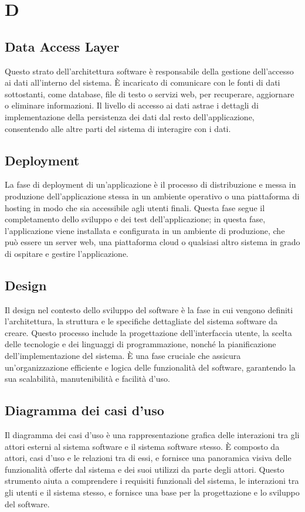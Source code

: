 \section*{D} 
\subsection*{Data Access Layer} 
Questo strato dell'architettura software è responsabile della gestione dell'accesso ai dati all'interno del sistema. È incaricato di comunicare con le fonti di dati sottostanti, come database, file di testo o servizi web, per recuperare, aggiornare o eliminare informazioni. Il livello di accesso ai dati astrae i dettagli di implementazione della persistenza dei dati dal resto dell'applicazione, consentendo alle altre parti del sistema di interagire con i dati.
\subsection*{Deployment} 
La fase di deployment di un'applicazione è il processo di distribuzione e messa in produzione dell'applicazione stessa in un ambiente operativo o una piattaforma di hosting in modo che sia accessibile agli utenti finali. Questa fase segue il completamento dello sviluppo e dei test dell'applicazione; in questa fase, l'applicazione viene installata e configurata in un ambiente di produzione, che può essere un server web, una piattaforma cloud o qualsiasi altro sistema in grado di ospitare e gestire l'applicazione.
\subsection*{Design} 
Il design nel contesto dello sviluppo del software è la fase in cui vengono definiti l'architettura, la struttura e le specifiche dettagliate del sistema software da creare. Questo processo include la progettazione dell'interfaccia utente, la scelta delle tecnologie e dei linguaggi di programmazione, nonché la pianificazione dell'implementazione del sistema. È una fase cruciale che assicura un'organizzazione efficiente e logica delle funzionalità del software, garantendo la sua scalabilità, manutenibilità e facilità d'uso.
\subsection*{Diagramma dei casi d'uso} 
Il diagramma dei casi d'uso è una rappresentazione grafica delle interazioni tra gli attori esterni al sistema software e il sistema software stesso. È composto da attori, casi d'uso e le relazioni tra di essi, e fornisce una panoramica visiva delle funzionalità offerte dal sistema e dei suoi utilizzi da parte degli attori. Questo strumento aiuta a comprendere i requisiti funzionali del sistema, le interazioni tra gli utenti e il sistema stesso, e fornisce una base per la progettazione e lo sviluppo del software.
